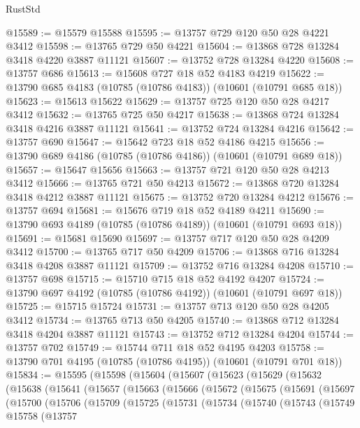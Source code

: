 \begin{lexlean}{RustStd}
\begin{coremodule}
@15589 := @15579 @15588
@15595 := @13757 @729 @120 @50 @28 @4221 @3412
@15598 := @13765 @729 @50 @4221
@15604 := @13868 @728 @13284 @3418 @4220 @3887 @11121
@15607 := @13752 @728 @13284 @4220
@15608 := @13757 @686
@15613 := @15608 @727 @18 @52 @4183 @4219
@15622 := @13790 @685 @4183 (@10785 (@10786 @4183)) (@10601 (@10791 @685 @18))
@15623 := @15613 @15622
@15629 := @13757 @725 @120 @50 @28 @4217 @3412
@15632 := @13765 @725 @50 @4217
@15638 := @13868 @724 @13284 @3418 @4216 @3887 @11121
@15641 := @13752 @724 @13284 @4216
@15642 := @13757 @690
@15647 := @15642 @723 @18 @52 @4186 @4215
@15656 := @13790 @689 @4186 (@10785 (@10786 @4186)) (@10601 (@10791 @689 @18))
@15657 := @15647 @15656
@15663 := @13757 @721 @120 @50 @28 @4213 @3412
@15666 := @13765 @721 @50 @4213
@15672 := @13868 @720 @13284 @3418 @4212 @3887 @11121
@15675 := @13752 @720 @13284 @4212
@15676 := @13757 @694
@15681 := @15676 @719 @18 @52 @4189 @4211
@15690 := @13790 @693 @4189 (@10785 (@10786 @4189)) (@10601 (@10791 @693 @18))
@15691 := @15681 @15690
@15697 := @13757 @717 @120 @50 @28 @4209 @3412
@15700 := @13765 @717 @50 @4209
@15706 := @13868 @716 @13284 @3418 @4208 @3887 @11121
@15709 := @13752 @716 @13284 @4208
@15710 := @13757 @698
@15715 := @15710 @715 @18 @52 @4192 @4207
@15724 := @13790 @697 @4192 (@10785 (@10786 @4192)) (@10601 (@10791 @697 @18))
@15725 := @15715 @15724
@15731 := @13757 @713 @120 @50 @28 @4205 @3412
@15734 := @13765 @713 @50 @4205
@15740 := @13868 @712 @13284 @3418 @4204 @3887 @11121
@15743 := @13752 @712 @13284 @4204
@15744 := @13757 @702
@15749 := @15744 @711 @18 @52 @4195 @4203
@15758 := @13790 @701 @4195 (@10785 (@10786 @4195)) (@10601 (@10791 @701 @18))
@15834 := @15595
    (@15598
      (@15604
        (@15607
          (@15623
            (@15629
              (@15632
                (@15638
                  (@15641
                    (@15657
                      (@15663
                        (@15666
                          (@15672
                            (@15675
                              (@15691
                                (@15697
                                  (@15700
                                    (@15706
                                      (@15709
                                        (@15725
                                          (@15731
                                            (@15734
                                              (@15740
                                                (@15743
                                                  (@15749
                                                    @15758
                                                    (@13757

\end{coremodule}
\end{lexlean}
